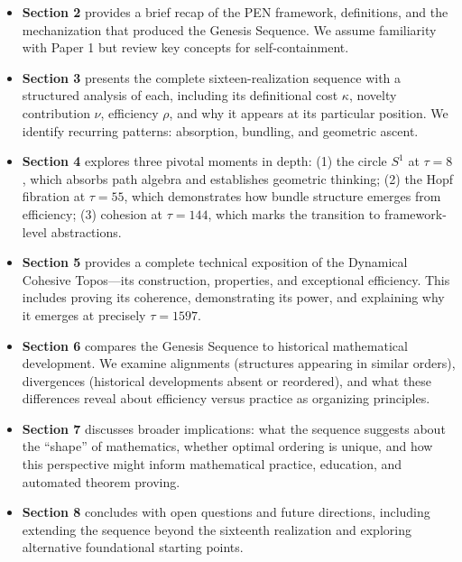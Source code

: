 \documentclass[11pt]{article}
\theoremstyle{definition}
\begin{document}
\begin{itemize}[leftmargin=*]
\item \textbf{Section 2} provides a brief recap of the PEN framework, definitions, and the mechanization that produced the Genesis Sequence. We assume familiarity with Paper 1 but review key concepts for self-containment.

\item \textbf{Section 3} presents the complete sixteen-realization sequence with a structured analysis of each, including its definitional cost $\kappa$, novelty contribution $\nu$, efficiency $\rho$, and why it appears at its particular position. We identify recurring patterns: absorption, bundling, and geometric ascent.

\item \textbf{Section 4} explores three pivotal moments in depth: (1) the circle $S^1$ at $\tau=8$, which absorbs path algebra and establishes geometric thinking; (2) the Hopf fibration at $\tau=55$, which demonstrates how bundle structure emerges from efficiency; (3) cohesion at $\tau=144$, which marks the transition to framework-level abstractions.

\item \textbf{Section 5} provides a complete technical exposition of the Dynamical Cohesive Topos—its construction, properties, and exceptional efficiency. This includes proving its coherence, demonstrating its power, and explaining why it emerges at precisely $\tau=1597$.

\item \textbf{Section 6} compares the Genesis Sequence to historical mathematical development. We examine alignments (structures appearing in similar orders), divergences (historical developments absent or reordered), and what these differences reveal about efficiency versus practice as organizing principles.

\item \textbf{Section 7} discusses broader implications: what the sequence suggests about the ``shape'' of mathematics, whether optimal ordering is unique, and how this perspective might inform mathematical practice, education, and automated theorem proving.

\item \textbf{Section 8} concludes with open questions and future directions, including extending the sequence beyond the sixteenth realization and exploring alternative foundational starting points.
\end{itemize}
\end{document}
